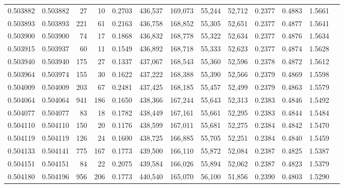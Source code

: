 \begin{tabular}{rrrrrrrrrrrrr}
0.503882 & 0.503882 &    27 &    10 &                                     0.2703 & 436,537 & 169,073 &  55,244 &  52,712 & 0.2377 & 0.4883 & 1.5661 \\
0.503893 & 0.503893 &   221 &    61 &                                     0.2163 & 436,758 & 168,852 &  55,305 &  52,651 & 0.2377 & 0.4877 & 1.5641 \\
0.503900 & 0.503900 &    74 &    17 &                                     0.1868 & 436,832 & 168,778 &  55,322 &  52,634 & 0.2377 & 0.4876 & 1.5634 \\
0.503915 & 0.503937 &    60 &    11 &                                     0.1549 & 436,892 & 168,718 &  55,333 &  52,623 & 0.2377 & 0.4874 & 1.5628 \\
0.503940 & 0.503940 &   175 &    27 &                                     0.1337 & 437,067 & 168,543 &  55,360 &  52,596 & 0.2378 & 0.4872 & 1.5612 \\
0.503964 & 0.503974 &   155 &    30 &                                     0.1622 & 437,222 & 168,388 &  55,390 &  52,566 & 0.2379 & 0.4869 & 1.5598 \\
0.504009 & 0.504009 &   203 &    67 &                                     0.2481 & 437,425 & 168,185 &  55,457 &  52,499 & 0.2379 & 0.4863 & 1.5579 \\
0.504064 & 0.504064 &   941 &   186 &                                     0.1650 & 438,366 & 167,244 &  55,643 &  52,313 & 0.2383 & 0.4846 & 1.5492 \\
0.504077 & 0.504077 &    83 &    18 &                                     0.1782 & 438,449 & 167,161 &  55,661 &  52,295 & 0.2383 & 0.4844 & 1.5484 \\
0.504110 & 0.504110 &   150 &    20 &                                     0.1176 & 438,599 & 167,011 &  55,681 &  52,275 & 0.2384 & 0.4842 & 1.5470 \\
0.504119 & 0.504119 &   126 &    24 &                                     0.1600 & 438,725 & 166,885 &  55,705 &  52,251 & 0.2384 & 0.4840 & 1.5459 \\
0.504133 & 0.504141 &   775 &   167 &                                     0.1773 & 439,500 & 166,110 &  55,872 &  52,084 & 0.2387 & 0.4825 & 1.5387 \\
0.504151 & 0.504151 &    84 &    22 &                                     0.2075 & 439,584 & 166,026 &  55,894 &  52,062 & 0.2387 & 0.4823 & 1.5379 \\
0.504180 & 0.504196 &   956 &   206 &                                     0.1773 & 440,540 & 165,070 &  56,100 &  51,856 & 0.2390 & 0.4803 & 1.5290 \\

\end{tabular}
